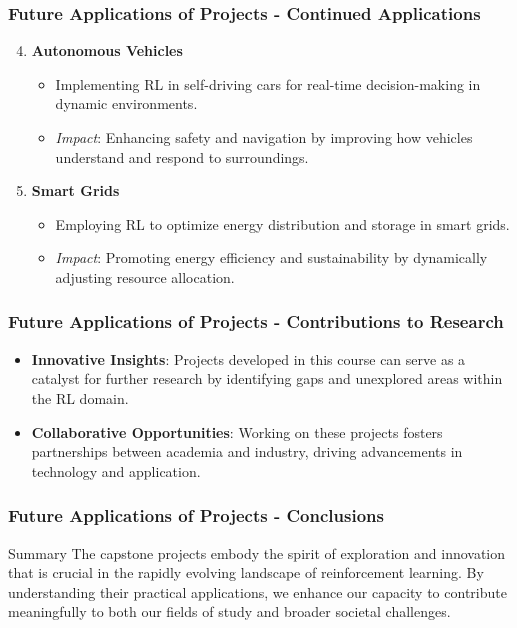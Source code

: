 \documentclass{beamer}
\begin{document}
\begin{frame}[fragile]
    \frametitle{Future Applications of Projects - Continued Applications}
    \begin{enumerate}
        \setcounter{enumi}{3} %
        \item \textbf{Autonomous Vehicles}
            \begin{itemize}
                \item Implementing RL in self-driving cars for real-time decision-making in dynamic environments.
                \item \textit{Impact}: Enhancing safety and navigation by improving how vehicles understand and respond to surroundings.
            \end{itemize}

        \item \textbf{Smart Grids}
            \begin{itemize}
                \item Employing RL to optimize energy distribution and storage in smart grids.
                \item \textit{Impact}: Promoting energy efficiency and sustainability by dynamically adjusting resource allocation.
            \end{itemize}
    \end{enumerate}
\end{frame}

\begin{frame}[fragile]
    \frametitle{Future Applications of Projects - Contributions to Research}
    \begin{itemize}
        \item \textbf{Innovative Insights}: Projects developed in this course can serve as a catalyst for further research by identifying gaps and unexplored areas within the RL domain.
        
        \item \textbf{Collaborative Opportunities}: Working on these projects fosters partnerships between academia and industry, driving advancements in technology and application.
    \end{itemize}
\end{frame}

\begin{frame}[fragile]
    \frametitle{Future Applications of Projects - Conclusions}
    \begin{block}{Summary}
        The capstone projects embody the spirit of exploration and innovation that is crucial in the rapidly evolving landscape of reinforcement learning. 
        By understanding their practical applications, we enhance our capacity to contribute meaningfully to both our fields of study and broader societal challenges.
    \end{block}
\end{frame}
\end{document}
